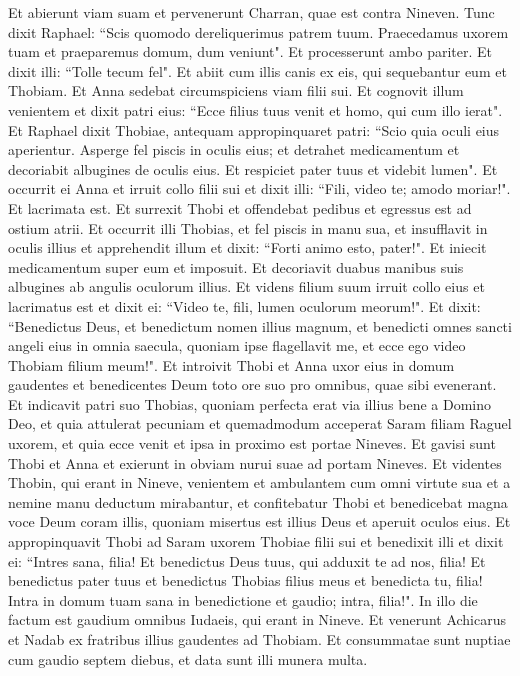 \begin{biblechapter}  
\verse Et abierunt viam suam et pervenerunt Charran, quae est contra Nineven.  
\verse Tunc dixit Raphael: “Scis quomodo dereliquerimus patrem tuum. 
\verse Praecedamus uxorem tuam et praeparemus domum, dum veniunt". 
\verse Et processerunt ambo pariter. Et dixit illi: “Tolle tecum fel". Et abiit cum illis canis ex eis, qui sequebantur eum et Thobiam. 
\verse Et Anna sedebat circumspiciens viam filii sui. 
\verse Et cognovit illum venientem et dixit patri eius: “Ecce filius tuus venit et homo, qui cum illo ierat". 
\verse Et Raphael dixit Thobiae, antequam appropinquaret patri: “Scio quia oculi eius aperientur.  
\verse Asperge fel piscis in oculis eius; et detrahet medicamentum et decoriabit albugines de oculis eius. Et respiciet pater tuus et videbit lumen". 
\verse Et occurrit ei Anna et irruit collo filii sui et dixit illi: “Fili, video te; amodo moriar!". Et lacrimata est. 
\verse Et surrexit Thobi et offendebat pedibus et egressus est ad ostium atrii. Et occurrit illi Thobias, 
\verse et fel piscis in manu sua, et insufflavit in oculis illius et apprehendit illum et dixit: “Forti animo esto, pater!". Et iniecit medicamentum super eum et imposuit. 
\verse Et decoriavit duabus manibus suis albugines ab angulis oculorum illius. 
\verse Et videns filium suum irruit collo eius 
\verse et lacrimatus est et dixit ei: “Video te, fili, lumen oculorum meorum!". Et dixit: “Benedictus Deus, et benedictum nomen illius magnum, et benedicti omnes sancti angeli eius in omnia saecula, 
\verse quoniam ipse flagellavit me, et ecce ego video Thobiam filium meum!". Et introivit Thobi et Anna uxor eius in domum gaudentes et benedicentes Deum toto ore suo pro omnibus, quae sibi evenerant. Et indicavit patri suo Thobias, quoniam perfecta erat via illius bene a Domino Deo, et quia attulerat pecuniam et quemadmodum acceperat Saram filiam Raguel uxorem, et quia ecce venit et ipsa in proximo est portae Nineves. Et gavisi sunt Thobi et Anna  
\verse et exierunt in obviam nurui suae ad portam Nineves. Et videntes Thobin, qui erant in Nineve, venientem et ambulantem cum omni virtute sua et a nemine manu deductum mirabantur, 
\verse et confitebatur Thobi et benedicebat magna voce Deum coram illis, quoniam misertus est illius Deus et aperuit oculos eius. Et appropinquavit Thobi ad Saram uxorem Thobiae filii sui et benedixit illi et dixit ei: “Intres sana, filia! Et benedictus Deus tuus, qui adduxit te ad nos, filia! Et benedictus pater tuus et benedictus Thobias filius meus et benedicta tu, filia! Intra in domum tuam sana in benedictione et gaudio; intra, filia!". In illo die factum est gaudium omnibus Iudaeis, qui erant in Nineve. 
\verse Et venerunt Achicarus et Nadab ex fratribus illius gaudentes ad Thobiam. Et consummatae sunt nuptiae cum gaudio septem diebus, et data sunt illi munera multa. 
\end{biblechapter}

